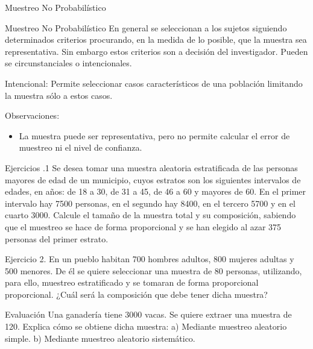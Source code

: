 \documentclass[11pt]{beamer}
\begin{document}
    \begin{frame}{Muestreo No Probabilístico }
      \begin{block}{Muestreo No Probabilístico}
          En general se seleccionan a los sujetos siguiendo determinados criterios procurando, en la medida de lo posible, que la muestra sea representativa. Sin embargo estos criterios son a decisión del investigador. Pueden se circunstanciales o intencionales.
      \end{block}
      Intencional: Permite seleccionar casos característicos de una población limitando la muestra sólo a estos casos.

      \vspace{0.5cm}
      Observaciones:
      \begin{itemize}
          \item La muestra puede ser representativa, pero no permite calcular el error de muestreo ni el nivel de confianza.

      \end{itemize}
    \end{frame}


    \begin{frame}{Ejercicios .1}
        Se desea tomar una muestra aleatoria estratificada de las personas mayores de edad de un municipio, cuyos estratos son los siguientes intervalos de edades, en años: de 18 a 30, de 31 a 45, de 46 a 60 y mayores de 60. En el primer intervalo hay 7500 personas, en el segundo hay 8400, en el tercero 5700 y en el cuarto 3000. Calcule el tamaño de la muestra total y su composición, sabiendo que el muestreo se hace de forma proporcional y se han elegido al azar 375 personas del primer estrato.
    \end{frame}

    \begin{frame}{Ejercicio 2.}
        En un pueblo habitan 700 hombres adultos, 800 mujeres adultas y 500 menores. De él se quiere seleccionar una muestra de 80 personas, utilizando, para ello, muestreo estratificado y se  tomaran de forma proporcional proporcional. ¿Cuál será la composición que debe tener dicha muestra?
    \end{frame}

    \begin{frame}{Evaluación}
        Una ganadería tiene 3000 vacas. Se quiere extraer una muestra de 120. Explica cómo se obtiene
        dicha muestra:
        a) Mediante muestreo aleatorio simple.
        b) Mediante muestreo aleatorio sistemático.
    \end{frame}
\end{document}
